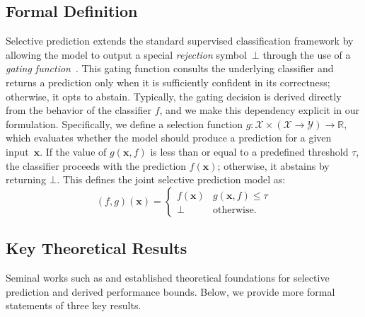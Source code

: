 \subsection{Formal Definition} 

Selective prediction extends the standard supervised classification framework by allowing the model to output a special \emph{rejection} symbol~$\bot$ through the use of a \textit{gating function}~\citep{yaniv2010riskcoveragecurve}. This gating function consults the underlying classifier and returns a prediction only when it is sufficiently confident in its correctness; otherwise, it opts to abstain. Typically, the gating decision is derived directly from the behavior of the classifier $f$, and we make this dependency explicit in our formulation. Specifically, we define a selection function $g: \mathcal{X} \times (\mathcal{X} \rightarrow \mathcal{Y}) \rightarrow \mathbb{R}$, which evaluates whether the model should produce a prediction for a given input~$\bm{x}$. If the value of $g(\bm{x}, f)$ is less than or equal to a predefined threshold $\tau$, the classifier proceeds with the prediction $f(\bm{x})$; otherwise, it abstains by returning $\bot$. This defines the joint selective prediction model as:
\begin{equation}
    (f,g)(\bm{x}) = \begin{cases}
  f(\bm{x})  & g(\bm{x}, f) \leq \tau \\
  \bot & \text{otherwise.}
\end{cases}
\end{equation}

\subsection{Key Theoretical Results}
Seminal works such as \citet{chow1957optimum} and \citet{el2010foundations} established theoretical foundations for selective prediction and derived performance bounds. Below, we provide more formal statements of three key results.

